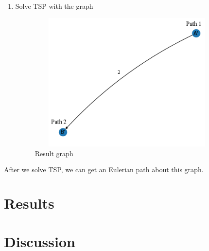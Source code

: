 \documentclass{article}
\begin{document}
\begin{enumerate}
\begin{figure}[H]
    \end{figure}
    \newpage
    \item Solve TSP with the graph
    \begin{figure}[H]
        \centering
        \includegraphics[width=10cm,height=7cm]{ex_img7.png}
        \caption{Result graph}
    \end{figure}
\end{enumerate}

After we solve TSP, we can get an Eulerian path about this graph.

\section{Results}


\section{Discussion}



{\small 


}
\end{document}
